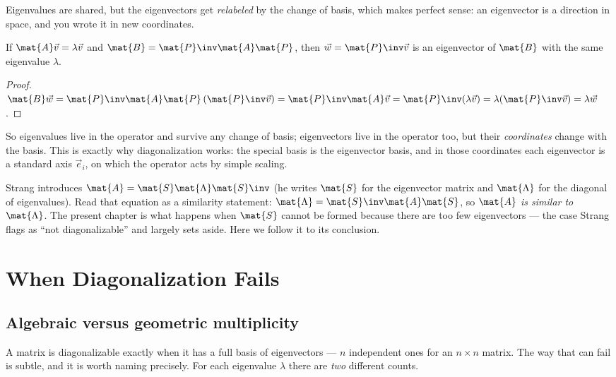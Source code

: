 Eigenvalues are shared, but the eigenvectors get \emph{relabeled} by the change of
basis, which makes perfect sense: an eigenvector is a direction in space, and you wrote
it in new coordinates.

\begin{proposition}
\label{ch28:eigvec-transform}
If $\mat{A}\vec{v}=\lambda\vec{v}$ and $\mat{B}=\mat{P}\inv\mat{A}\mat{P}$, then
$\vec{w}=\mat{P}\inv\vec{v}$ is an eigenvector of $\mat{B}$ with the same eigenvalue
$\lambda$.
\end{proposition}

\begin{proof}
$\mat{B}\vec{w}=\mat{P}\inv\mat{A}\mat{P}\,(\mat{P}\inv\vec{v})
=\mat{P}\inv\mat{A}\vec{v}=\mat{P}\inv(\lambda\vec{v})=\lambda(\mat{P}\inv\vec{v})=\lambda\vec{w}$.
\end{proof}

So eigenvalues live in the operator and survive any change of basis; eigenvectors live
in the operator too, but their \emph{coordinates} change with the basis. This is exactly
why diagonalization works: the special basis is the eigenvector basis, and in those
coordinates each eigenvector is a standard axis $\vec{e}_i$, on which the operator acts
by simple scaling.

\begin{strangbox}
Strang introduces $\mat{A}=\mat{S}\mat{\Lambda}\mat{S}\inv$ (he writes $\mat{S}$ for the
eigenvector matrix and $\mat{\Lambda}$ for the diagonal of eigenvalues). Read that
equation as a similarity statement: $\mat{\Lambda}=\mat{S}\inv\mat{A}\mat{S}$, so
$\mat{A}$ \emph{is similar to} $\mat{\Lambda}$. The present chapter is what happens when
$\mat{S}$ cannot be formed because there are too few eigenvectors --- the case Strang
flags as ``not diagonalizable'' and largely sets aside. Here we follow it to its
conclusion.
\end{strangbox}

\section{When Diagonalization Fails}
\label{ch28:fails}

\subsection{Algebraic versus geometric multiplicity}

A matrix is diagonalizable exactly when it has a full basis of eigenvectors --- $n$
independent ones for an $n\times n$ matrix. The way that can fail is subtle, and it is
worth naming precisely. For each eigenvalue $\lambda$ there are \emph{two} different
counts.

